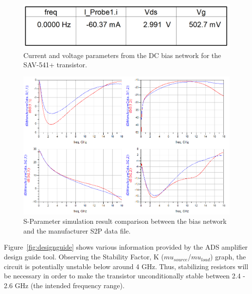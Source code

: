 \documentclass[conference]{IEEEtran}
\begin{document}
\begin{figure}[!h]
\centering
\includegraphics[scale=0.21]{pics/DCBiasResults.png}
\caption{Current and voltage  parameters from the DC bias network for the SAV-541+ transistor.}
\label{fig:dcvalues}
\end{figure}

\begin{figure}[!h]
\centering
\includegraphics[scale=0.35]{pics/SParameterComparison.png}
\caption{S-Parameter simulation result comparison between the bias network and the manufacturer S2P data file.}
\label{fig:sparamresult}
\end{figure}

Figure~\ref{fig:designguide} shows various information provided by the ADS amplifier design guide tool.  Observing the Stability Factor, K ($mu_{source}$/$mu_{load}$) graph, the circuit is potentially unstable below around 4 GHz.  Thus, stabilizing resistors will be necessary in order to make the transistor unconditionally stable between 2.4 - 2.6 GHz (the intended frequency range).
\end{document}
